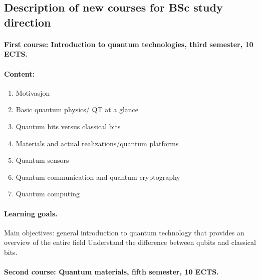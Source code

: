 \documentclass[%
oneside,                 %
final,                   %
10pt]{article}
\begin{document}
\noindent
\subsection*{Description of new courses for BSc study direction}

\paragraph{First course: Introduction to quantum technologies, third semester, 10 ECTS.}

\paragraph{Content:}
\begin{enumerate}
\item Motivasjon 

\item Basic quantum physics/ QT at a glance 

\item Quantum bits versus classical bits

\item Materials and actual realizations/quantum platforms

\item Quantum sensors

\item Quantum communication and quantum cryptography

\item Quantum computing
\end{enumerate}

\noindent




\paragraph{Learning goals.}
Main objectives: general introduction to quantum technology that provides an overview of the entire field
Understand the difference between qubits and classical bits.



\paragraph{Second course: Quantum materials, fifth semester, 10 ECTS.}
\end{document}
